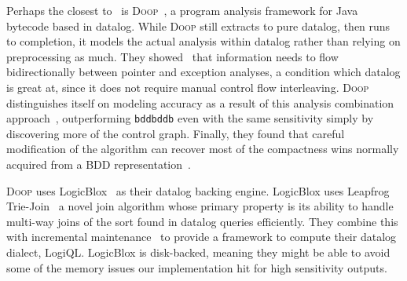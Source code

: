 Perhaps the closest to \aliasname\ is \textsc{Doop}~\cite{doop1,doop2,doop3}, a program analysis framework for Java bytecode based in datalog.
While \textsc{Doop} still extracts to pure datalog, then runs to completion, it models the actual analysis within datalog rather than relying on preprocessing as much.
They showed~\cite{doop1} that information needs to flow bidirectionally between pointer and exception analyses, a condition which datalog is great at, since it does not require manual control flow interleaving.
\textsc{Doop} distinguishes itself on modeling accuracy as a result of this analysis combination approach~\cite{doop2}, outperforming \texttt{bddbddb} even with the same sensitivity simply by discovering more of the control graph.
Finally, they found that careful modification of the algorithm can recover most of the compactness wins normally acquired from a BDD representation~\cite{doop3}.

\textsc{Doop} uses LogicBlox~\cite{logicblox} as their datalog backing engine.
LogicBlox uses Leapfrog Trie-Join~\cite{lftj} a novel join algorithm whose primary property is its ability to handle multi-way joins of the sort found in datalog queries efficiently.
They combine this with incremental maintenance~\cite{lftj-incr} to provide a framework to compute their datalog dialect, LogiQL.
LogicBlox is disk-backed, meaning they might be able to avoid some of the memory issues our implementation hit for high sensitivity outputs.
